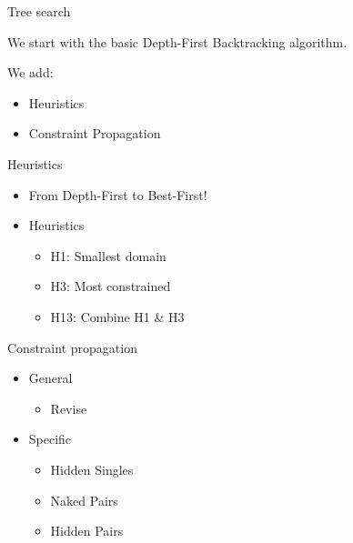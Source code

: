 \documentclass{beamer}
\begin{document}
\begin{frame}{Tree search}

We start with the basic Depth-First Backtracking algorithm.

We add:
\begin{itemize}
\item Heuristics
\item Constraint Propagation
\end{itemize}

\end{frame}

\begin{frame}{Heuristics}

\begin{itemize}
\item From Depth-First to Best-First!
\item Heuristics
\begin{itemize}
    \item H1: Smallest domain
    \item H3: Most constrained
    \item H13: Combine H1 \& H3
\end{itemize}
\end{itemize}

\end{frame}


\begin{frame}{Constraint propagation}

\begin{itemize}
\item General
    \begin{itemize}
    \item Revise
    \end{itemize}
\item Specific
    \begin{itemize}
    \item Hidden Singles
    \item Naked Pairs
    \item Hidden Pairs
    \end{itemize}
\end{itemize}

\end{frame}
\end{document}
